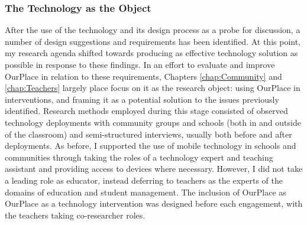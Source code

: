 \subsubsection{The Technology as the Object}
After the use of the technology and its design process as a probe for discussion, a number of design suggestions and requirements has been identified. At this point, my research agenda shifted towards producing as effective technology solution as possible in response to these findings. In an effort to evaluate and improve OurPlace in relation to these requirements, Chapters \ref{chap:Community} and \ref{chap:Teachers} largely place focus on it as the research object: using OurPlace in interventions, and framing it as a potential solution to the issues previously identified. Research methods employed during this stage consisted of observed technology deployments with community groups and schools (both in and outside of the classroom) and semi-structured interviews, usually both before and after deployments. As before, I supported the use of mobile technology in schools and communities through taking the roles of a technology expert and teaching assistant and providing access to devices where necessary. However, I did not take a leading role as educator, instead deferring to teachers as the experts of the domains of education and student management. The inclusion of OurPlace as OurPlace as a technology intervention was designed before each engagement, with the teachers taking co-researcher roles.

